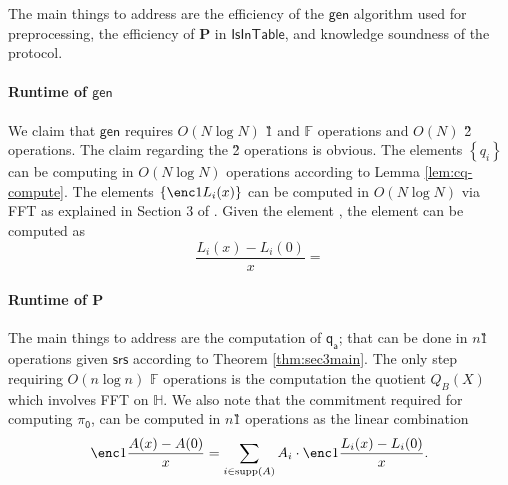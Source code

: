 \documentclass[11pt]{article} %
\newcommand{\F}{\ensuremath{\mathbb F}\xspace}
\newcommand{\srs}{\ensuremath{\mathsf{srs}}\xspace}
\newcommand{\gen}{\ensuremath{\mathsf{gen}}\xspace}
\newcommand{\prv}{\ensuremath{\mathsf{\mathbf{P}}}\xspace}
\newcommand{\set}[1]{\ensuremath{\left\{#1\right\}}\xspace}
\newcommand{\isintable}{\ensuremath{\mathsf{IsInTable}}\xspace}
\newcommand{\subspace}{\ensuremath{\mathbb{H}}\xspace}
\newcommand{\witsize}{\ensuremath{n}\xspace}
\newcommand{\witruntime}{\ensuremath{\witsize\log\witsize}\xspace}
\newcommand{\tabsize}{\ensuremath{N}\xspace}
\newcommand{\tabruntime}{\ensuremath{\tabsize\log\tabsize}\xspace}
\newcommand{\qa}{\ensuremath{\mathsf{q_a}}\xspace}
\newcommand{\zerproof}{\ensuremath{\mathsf{\pi_0}}\xspace}
\newcommand{\supp}[1]{\ensuremath{\mathrm{supp}(#1)}\xspace}
\begin{document}
                  
    The  main things to address are the efficiency of the \gen algorithm used for preprocessing, the efficiency of \prv in \isintable, and knowledge soundness of the protocol.
    
    \paragraph{Runtime of \gen}
We claim that \gen requires $O(\tabruntime)$ \G1 and \F operations and $O(\tabsize)$ \G2 operations.
The claim regarding the \G2 operations is obvious.
The elements \set{q_i} can be computing in $O(\tabruntime)$ operations according to Lemma \ref{lem:cq-compute}.
The elements \set{\enc1{L_i(x)}} can be computed in $O(\tabruntime)$ via FFT as explained in Section 3 of \cite{FirstMPC}.
Given the element , the element  can be computed as
\[\frac{L_i(x)-L_i(0)}{x}=\]

\paragraph{Runtime of \prv}
The main things to address are the computation of \qa; that can be done in \witsize \G1 operations given \srs according to Theorem \ref{thm:sec3main}.
The only step requiring $O(\witruntime)$ \F operations is the computation the quotient $Q_B(X)$ which involves FFT on \subspace.
We also note that the commitment  required for computing \zerproof, can be computed in \witsize \G1 operations
as the linear combination 
\[\enc1{\frac{A(x)-A(0)}{x}} =\sum_{i\in \supp{A}}A_i\cdot \enc1{\frac{L_i(x)-L_i(0)}{x}} . \]
\end{document}
